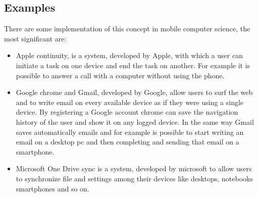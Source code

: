 \subsection{Examples}
There are some implementation of this concept in mobile computer science, the most significant are:
\begin{itemize}
	\item Apple continuity, is a system, developed by Apple, with which a user can initiate a task on one device and end the task on another. For example it is possible to answer a call with a computer without using the phone.
	\item Google chrome and Gmail, developed by Google, allow users to surf the web and to write email on every available device as if they were using a single device. By registering a Google account chrome can save the navigation history of the user and show it on any logged device. In the same way Gmail saves automatically emails and for example is possible to start writing an email on a desktop pc and then completing and sending that email on a smartphone.
	\item Microsoft One Drive sync is a system, developed by microsoft to allow users to synchronize file and settings among their devices like desktops, notebooks smartphones and so on.
\end{itemize}





%
